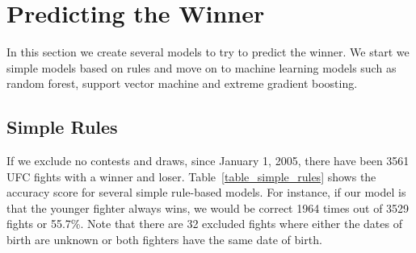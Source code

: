 \clearpage
\section{Predicting the Winner}

In this section we create several models to try to predict
the winner. We start we simple models based on rules
and move on to machine learning models such as
random forest, support vector machine and extreme
gradient boosting.

\subsection*{Simple Rules}

If we exclude no contests and draws, since January 1, 2005,
there have been 3561 UFC fights with a winner and loser.
Table~\ref{table_simple_rules} shows the accuracy score
for several simple rule-based models. For instance, if
our model is that the younger fighter always wins, we would
be correct 1964 times out of 3529 fights or 55.7\%. Note that
there are 32 excluded fights where either the dates of birth
are unknown or both fighters have the same date of birth.

